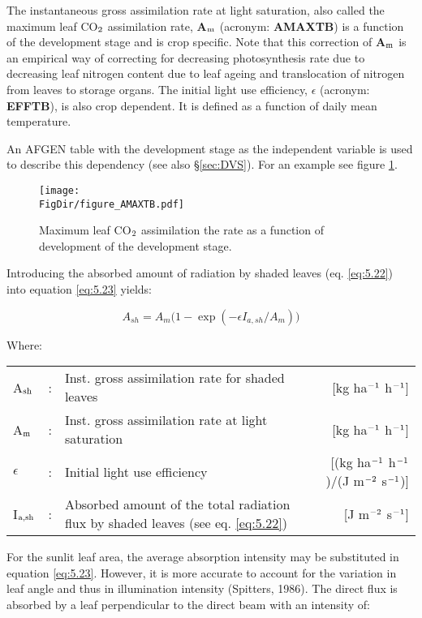 The instantaneous gross assimilation rate at light saturation, also
called the maximum leaf CO$_{{\rm 2}}$ assimilation rate, {\bf A$_{{\rm m}}$} (acronym: 
{\bf AMAXTB}) is a function of the development stage and is crop specific. Note that this
correction of {\bf A$_{{\rm m}}$} is an empirical way of correcting for decreasing photosynthesis
rate due to decreasing leaf nitrogen content due to leaf ageing and  translocation of nitrogen
from leaves to storage organs. The initial light use efficiency, {\bf $\epsilon$}
(acronym: {\bf EFFTB}), is also crop dependent. It is defined as a function of daily mean temperature. 

An AFGEN table with the development stage as the independent variable is used to describe 
this dependency (see also \S \ref{sec:DVS}). For an example see figure \ref{fig:AMAXTB}.

\begin{figure}[p]
	\centering
	\texttt{[image: \\FigDir/figure\_AMAXTB.pdf]}
	\caption{Maximum leaf CO$_{{\rm 2}}$ assimilation the rate as a function of development of
		the development stage.}
	\label{fig:AMAXTB}
\end{figure}

Introducing the absorbed amount of radiation by shaded leaves (eq. \ref{eq:5.22}) into 
equation \ref{eq:5.23} yields:

\begin{equation}
\label{eq:5.24}
A_{sh} = A_{m} \big(1-\exp({{-\epsilon I_{a,sh} }/{A_m}} ) \big)
\end{equation}

Where:\\[5pt]
\begin{tabularx}{\textwidth}{llXr}
	A$_{{\rm sh}}$ &:& Inst. gross assimilation rate for shaded leaves  & 
	[kg ha$^{{\rm -1}}$ h$^{{\rm -1}}$]\\
	A$_{{\rm m}}$ &:& Inst. gross assimilation rate at light saturation & 
	[kg ha$^{{\rm -1}}$ h$^{{\rm -1}}$]\\
	$\epsilon$ &:& Initial light use efficiency  &  
	[(kg ha$^{{\rm -1}}$ h$^{{\rm -1}}$)/(J m$^{{\rm -2}}$ s$^{{\rm -1}}$)]\\
	I$_{{\rm a,sh}}$ &:& Absorbed amount of the total radiation flux  by shaded leaves (see eq. \ref{eq:5.22})   &
	[J m$^{{\rm -2}}$ s$^{{\rm -1}}$]\\
\end{tabularx}

For the sunlit leaf area, the average absorption intensity may be substituted in equation
\ref{eq:5.23}. However, it is more accurate to account for the variation in leaf angle and thus in
illumination intensity (Spitters, 1986). The direct flux is absorbed by a leaf perpendicular
to the direct beam with an intensity of: 

